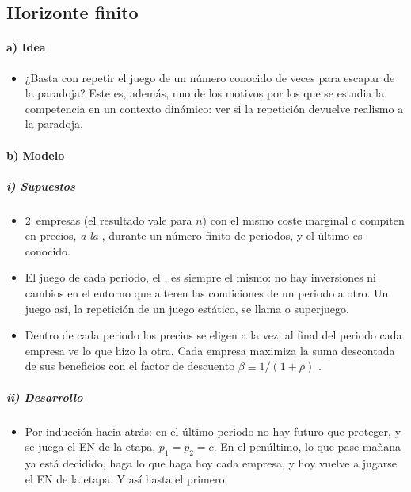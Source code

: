 \documentclass[11pt]{article}
\begin{document}
\subsection{Horizonte finito}\label{sec:horizonte-finito}

\paragraph{a) Idea}

\begin{itemize}
\item ¿Basta con repetir el juego de  un número conocido de veces para escapar de la paradoja? Este es, además, uno de los motivos por los que se estudia la competencia en un contexto dinámico: ver si la repetición devuelve realismo a la paradoja.
\end{itemize}

\paragraph{b) Modelo}

\subparagraph{i) Supuestos}

\begin{itemize}
\item 2~empresas (el resultado vale para $n$) con el mismo coste marginal $c$ compiten en precios, \emph{a la} , durante un número finito de periodos, y el último es conocido.
\item El juego de cada periodo, el , es siempre el mismo: no hay inversiones ni cambios en el entorno que alteren las condiciones de un periodo a otro. Un juego así, la repetición de un juego estático, se llama  o superjuego.
\item Dentro de cada periodo los precios se eligen a la vez; al final del periodo cada empresa ve lo que hizo la otra. Cada empresa maximiza la suma descontada de sus beneficios con el factor de descuento $\beta\equiv1/(1+\rho)$ .
\end{itemize}

\subparagraph{ii) Desarrollo}

\begin{itemize}
\item Por inducción hacia atrás: en el último periodo no hay futuro que proteger, y se juega el EN de la etapa, $p_1=p_2=c$. En el penúltimo, lo que pase mañana ya está decidido, haga lo que haga hoy cada empresa, y hoy vuelve a jugarse el EN de la etapa. Y así hasta el primero.
\end{itemize}
\end{document}
